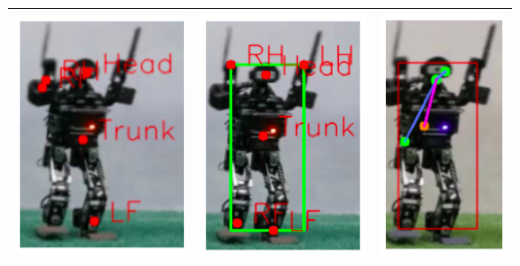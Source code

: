 \begin{longtable}{|c|c|c|}
  \includegraphics{gambar/nimbro-2.png} & \includegraphics{gambar/rcnn-2.png} & \includegraphics{gambar/yolo-2.png} \\
  \hline

\end{longtable}
